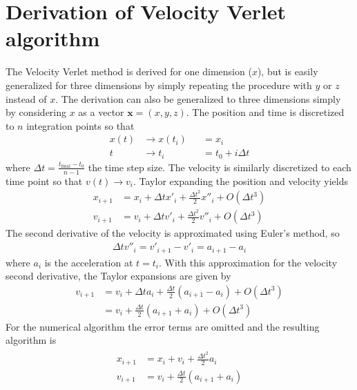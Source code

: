 \documentclass[aps,reprint]{revtex4-1}
\begin{document}
\section{Derivation of Velocity Verlet algorithm}
\label{sec:velocityverlet}
The Velocity Verlet method is derived for one dimension ($x$), but is easily
generalized for three dimensions by simply repeating the procedure with $y$
or $z$ instead of $x$. The derivation can also be generalized to three dimensions
simply by considering $x$ as a vector $\mathbf{x} = (x, y, z)$.
The position and time is discretized to $n$ integration points so that
\begin{align*}
  x(t) &\rightarrow x(t_i) &&= x_i \\
  t &\rightarrow t_i &&= t_0 + i\Delta{t}
\end{align*}
where $\Delta{t} = \frac{t_\text{final} - t_0}{n-1}$ the time step size. The velocity
is similarly discretized to each time point so that $v(t) \rightarrow v_i$.
Taylor expanding the position and velocity yields
\begin{align*}
  x_{i+1} &= x_i + \Delta{t} x'_i + \frac{\Delta{t}^2}{2} x''_i + O(\Delta{t}^3) \\
  v_{i+1} &= v_i + \Delta{t} v'_i + \frac{\Delta{t}^2}{2} v''_i + O(\Delta{t}^3)
\end{align*}
The second derivative of the velocity is approximated using Euler's method, so
\begin{align*}
  \Delta{t} v''_i = v'_{i+1} - v'_{i} = a_{i+1} - a_{i}
\end{align*}
where $a_i$ is the acceleration at $t = t_i$. With this approximation for the
velocity second derivative, the Taylor expansions are given by
\begin{align*}
  v_{i+1} &= v_i + \Delta{t} a_i + \frac{\Delta{t}}{2} (a_{i+1} - a_i) + O(\Delta{t}^3) \\
          &= v_i + \frac{\Delta{t}}{2} (a_{i+1} + a_{i}) + O(\Delta{t}^3)
\end{align*}
For the numerical algorithm the error terms are omitted and the resulting
algorithm is
\begin{align}
  \begin{split}
    x_{i+1} &= x_i + v_i + \frac{\Delta{t}^2}{2} a_i \\
    v_{i+1} &= v_i + \frac{\Delta{t}}{2}(a_{i+1} + a_{i})
  \end{split}
\end{align}
\end{document}
